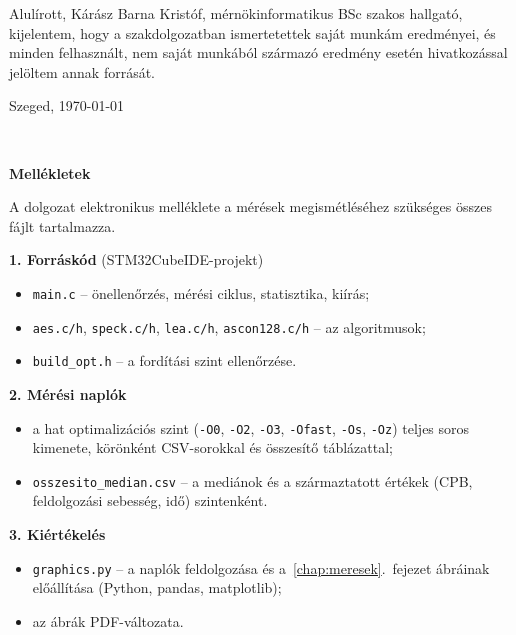 \documentclass[a4paper,12pt]{report}
\theoremstyle{definition}
\theoremstyle{remark}
\begin{document}

\vspace{2 cm}

Alulírott, Kárász Barna Kristóf, mérnökinformatikus BSc szakos hallgató, kijelentem, hogy a szakdolgozatban ismertetettek saját munkám eredményei, és minden felhasznált, nem saját munkából származó eredmény esetén hivatkozással jelöltem annak forrását.


\begin{flushleft}
\vspace*{1cm}
Szeged, \today
\end{flushleft}

\begin{flushright}
 \vspace*{1cm}
 \makebox[7cm]{\rule{6cm}{.4pt}}\\
\end{flushright}

\pagebreak

\newpage
{\Huge \bf Mellékletek}


\vspace{2 cm}

A dolgozat elektronikus melléklete a mérések megismétléséhez szükséges összes fájlt tartalmazza. %

\medskip
\noindent\textbf{1. Forráskód} (STM32CubeIDE-projekt)
\begin{itemize}
	\item \texttt{main.c} -- önellenőrzés, mérési ciklus, statisztika, kiírás;
	\item \texttt{aes.c/h}, \texttt{speck.c/h}, \texttt{lea.c/h}, \texttt{ascon128.c/h} -- az algoritmusok;
	\item \texttt{build\_opt.h} -- a fordítási szint ellenőrzése.
\end{itemize}

\noindent\textbf{2. Mérési naplók}
\begin{itemize}
	\item a hat optimalizációs szint (\texttt{-O0}, \texttt{-O2}, \texttt{-O3}, \texttt{-Ofast}, \texttt{-Os}, \texttt{-Oz}) teljes soros kimenete, körönként CSV-sorokkal és összesítő táblázattal;
	\item \texttt{osszesito\_median.csv} -- a mediánok és a származtatott értékek (CPB, feldolgozási sebesség, idő) szintenként.
\end{itemize}

\noindent\textbf{3. Kiértékelés}
\begin{itemize}
	\item \texttt{graphics.py} -- a naplók feldolgozása és a~\ref{chap:meresek}.~fejezet ábráinak előállítása (Python, pandas, matplotlib);
	\item az ábrák PDF-változata.
\end{itemize}
\end{document}

